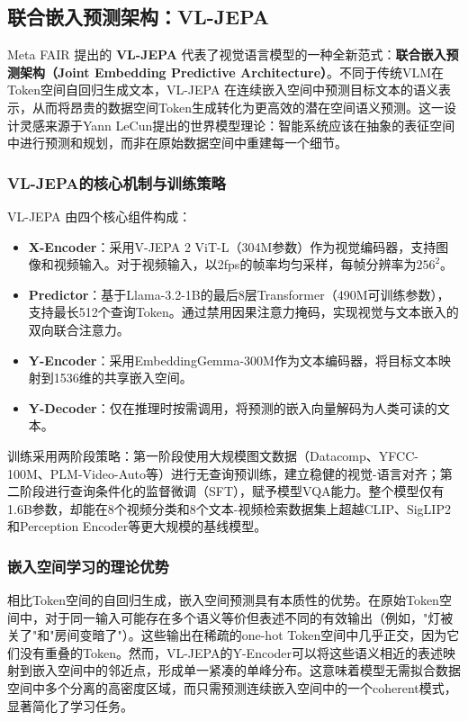 \subsection{联合嵌入预测架构：VL-JEPA}
Meta FAIR 提出的 \textbf{VL-JEPA} \cite{vl_jepa} 代表了视觉语言模型的一种全新范式：\textbf{联合嵌入预测架构（Joint Embedding Predictive Architecture）}。不同于传统VLM在Token空间自回归生成文本，VL-JEPA 在连续嵌入空间中预测目标文本的语义表示，从而将昂贵的数据空间Token生成转化为更高效的潜在空间语义预测。这一设计灵感来源于Yann LeCun提出的世界模型理论：智能系统应该在抽象的表征空间中进行预测和规划，而非在原始数据空间中重建每一个细节。

\subsubsection{VL-JEPA的核心机制与训练策略}
VL-JEPA 由四个核心组件构成：
\begin{itemize}
    \item \textbf{X-Encoder}：采用V-JEPA 2 ViT-L（304M参数）作为视觉编码器，支持图像和视频输入。对于视频输入，以2fps的帧率均匀采样，每帧分辨率为$256^2$。
    \item \textbf{Predictor}：基于Llama-3.2-1B的最后8层Transformer（490M可训练参数），支持最长512个查询Token。通过禁用因果注意力掩码，实现视觉与文本嵌入的双向联合注意力。
    \item \textbf{Y-Encoder}：采用EmbeddingGemma-300M作为文本编码器，将目标文本映射到1536维的共享嵌入空间。
    \item \textbf{Y-Decoder}：仅在推理时按需调用，将预测的嵌入向量解码为人类可读的文本。
\end{itemize}

训练采用两阶段策略：第一阶段使用大规模图文数据（Datacomp、YFCC-100M、PLM-Video-Auto等）进行无查询预训练，建立稳健的视觉-语言对齐；第二阶段进行查询条件化的监督微调（SFT），赋予模型VQA能力。整个模型仅有1.6B参数，却能在8个视频分类和8个文本-视频检索数据集上超越CLIP、SigLIP2和Perception Encoder等更大规模的基线模型。

\subsubsection{嵌入空间学习的理论优势}
相比Token空间的自回归生成，嵌入空间预测具有本质性的优势。在原始Token空间中，对于同一输入可能存在多个语义等价但表述不同的有效输出（例如，"灯被关了"和"房间变暗了"）。这些输出在稀疏的one-hot Token空间中几乎正交，因为它们没有重叠的Token。然而，VL-JEPA的Y-Encoder可以将这些语义相近的表述映射到嵌入空间中的邻近点，形成单一紧凑的单峰分布。这意味着模型无需拟合数据空间中多个分离的高密度区域，而只需预测连续嵌入空间中的一个coherent模式，显著简化了学习任务。


